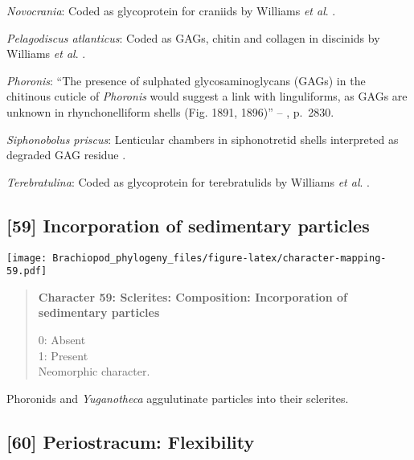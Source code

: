 \documentclass[openany]{book}
\theoremstyle{definition}
\theoremstyle{definition}
\theoremstyle{definition}
\theoremstyle{remark}
\begin{document}
\hypertarget{Novocrania-coding-58}{}
\emph{Novocrania}: Coded as glycoprotein for craniids by Williams
\emph{et al}. \citeyearpar{Williams1996Asupra}.

\hypertarget{Pelagodiscus_atlanticus-coding-58}{}
\emph{Pelagodiscus atlanticus}: Coded as GAGs, chitin and collagen in
discinids by Williams \emph{et al}. \citeyearpar{Williams1996Asupra}.

\hypertarget{Phoronis-coding-58}{}
\emph{Phoronis}: ``The presence of sulphated glycosaminoglycans (GAGs)
in the chitinous cuticle of \emph{Phoronis}
\citep[p.~215]{Herrmann1997Phoronida} would suggest a link with
linguliforms, as GAGs are unknown in rhynchonelliform shells (Fig. 1891,
1896)'' -- \citet{Williams2007Supplement}, p.~2830.

\hypertarget{Siphonobolus_priscus-coding-58}{}
\emph{Siphonobolus priscus}: Lenticular chambers in siphonotretid shells
interpreted as degraded GAG residue
\citep{Williams2004Chemicostructure}.

\hypertarget{Terebratulina-coding-58}{}
\emph{Terebratulina}: Coded as glycoprotein for terebratulids by
Williams \emph{et al}. \citeyearpar{Williams1996Asupra}.

\subsection*{{[}59{]} Incorporation of sedimentary
particles}\label{incorporation-of-sedimentary-particles}

\texttt{[image: Brachiopod\_phylogeny\_files/figure-latex/character-mapping-59.pdf]}

\begin{quote}
\textbf{Character 59: Sclerites: Composition: Incorporation of
sedimentary particles}

0: Absent\\
1: Present\\
Neomorphic character.
\end{quote}

Phoronids and \emph{Yuganotheca} aggulutinate particles into their
sclerites.

\subsection*{{[}60{]} Periostracum:
Flexibility}\label{periostracum-flexibility}
\end{document}
